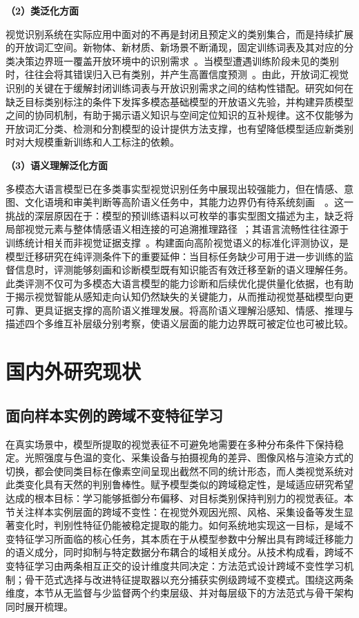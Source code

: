 \noindent\textbf{（2）类泛化方面} 

视觉识别系统在实际应用中面对的不再是封闭且预定义的类别集合，而是持续扩展的开放词汇空间。新物体、新材质、新场景不断涌现，固定训练词表及其对应的分类决策边界班一覆盖开放环境中的识别需求~\cite{kirillov2023segment,radford2021learning}。当模型遭遇训练阶段未见的类别时，往往会将其错误归入已有类别，并产生高置信度预测~\cite{kundu2022towards}。由此，开放词汇视觉识别的关键在于缓解封闭训练词表与开放识别需求之间的结构性错配。研究如何在缺乏目标类别标注的条件下发挥多模态基础模型的开放语义先验，并构建异质模型之间的协同机制，有助于揭示语义知识与空间定位知识的互补规律。这不仅能够为开放词汇分类、检测和分割模型的设计提供方法支撑，也有望降低模型适应新类别时对大规模重新训练和人工标注的依赖。

\newpage
\noindent\textbf{（3）语义理解泛化方面} 

多模态大语言模型已在多类事实型视觉识别任务中展现出较强能力，但在情感、意图、文化语境和审美判断等高阶语义任务中，其能力边界仍有待系统刻画~~\cite{mmbench2023,achlioptas2021artemis,eemobench2025}。这一挑战的深层原因在于：模型的预训练语料以可枚举的事实型图文描述为主，缺乏将局部视觉元素与整体情感语义相连接的可追溯推理路径~\cite{zhao2014exploring,aesexpert2024}；其语言流畅性往往源于训练统计相关而非视觉证据支撑~\cite{eemobench2025}。构建面向高阶视觉语义的标准化评测协议，是模型迁移研究在纯评测条件下的重要延伸：当目标任务缺少可用于进一步训练的监督信息时，评测能够刻画和诊断模型既有知识能否有效迁移至新的语义理解任务。此类评测不仅可为多模态大语言模型的能力诊断和后续优化提供量化依据，也有助于揭示视觉智能从感知走向认知仍然缺失的关键能力，从而推动视觉基础模型向更可靠、更具证据支撑的高阶语义推理发展。将高阶语义理解沿感知、情感、推理与描述四个多维互补层级分别考察，使语义层面的能力边界既可被定位也可被比较。

\section{国内外研究现状}

\subsection{面向样本实例的跨域不变特征学习}

在真实场景中，模型所提取的视觉表征不可避免地需要在多种分布条件下保持稳定。光照强度与色温的变化、采集设备与拍摄视角的差异、图像风格与渲染方式的切换，都会使同类目标在像素空间呈现出截然不同的统计形态，而人类视觉系统对此类变化具有天然的判别鲁棒性。赋予模型类似的跨域稳定性，是域适应研究希望达成的根本目标：学习能够抵御分布偏移、对目标类别保持判别力的视觉表征。本节关注样本实例层面的跨域不变性：在视觉外观因光照、风格、采集设备等发生显著变化时，判别性特征仍能被稳定提取的能力。如何系统地实现这一目标，是域不变特征学习所面临的核心任务，其本质在于从模型参数中分解出具有跨域迁移能力的语义成分，同时抑制与特定数据分布耦合的域相关成分。从技术构成看，跨域不变特征学习由两条相互正交的设计维度共同决定：方法范式设计跨域不变性学习机制；骨干范式选择与改进特征提取器以充分捕获实例级跨域不变模式。围绕这两条维度，本节从无监督与少监督两个约束层级、并对每层级下的方法范式与骨干架构同时展开梳理。


